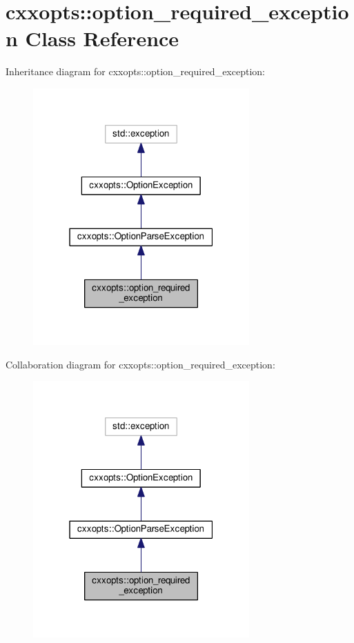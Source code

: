 \hypertarget{classcxxopts_1_1option__required__exception}{}\section{cxxopts\+:\+:option\+\_\+required\+\_\+exception Class Reference}
\label{classcxxopts_1_1option__required__exception}


Inheritance diagram for cxxopts\+:\+:option\+\_\+required\+\_\+exception\+:
\nopagebreak
\begin{figure}[H]
\begin{center}
\leavevmode
\includegraphics[width=235pt]{classcxxopts_1_1option__required__exception__inherit__graph}
\end{center}
\end{figure}


Collaboration diagram for cxxopts\+:\+:option\+\_\+required\+\_\+exception\+:
\nopagebreak
\begin{figure}[H]
\begin{center}
\leavevmode
\includegraphics[width=235pt]{classcxxopts_1_1option__required__exception__coll__graph}
\end{center}
\end{figure}
